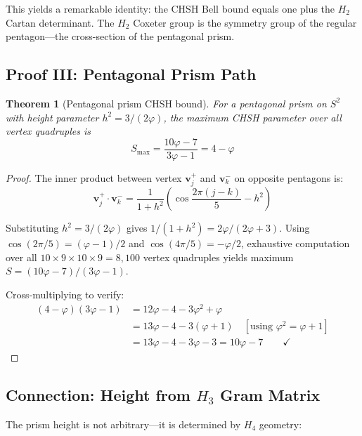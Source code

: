 \documentclass[12pt,a4paper]{article}
\newtheorem{theorem}{Theorem}
\newcommand{\vp}{\varphi}
\newcommand{\Smax}{S_{\max}}
\begin{document}
This yields a remarkable identity: the CHSH Bell bound equals one plus 
the $H_2$ Cartan determinant. The $H_2$ Coxeter group is the symmetry group 
of the regular pentagon---the cross-section of the pentagonal prism.

\subsection{Proof III: Pentagonal Prism Path}
\label{sec:proof_prism}

\begin{theorem}[Pentagonal prism CHSH bound]
\label{thm:prism_bound}
For a pentagonal prism on $S^2$ with height parameter $h^2 = 3/(2\vp)$, 
the maximum CHSH parameter over all vertex quadruples is
\begin{equation}
\Smax = \frac{10\vp - 7}{3\vp - 1} = 4 - \vp
\end{equation}
\end{theorem}

\begin{proof}
The inner product between vertex $\mathbf{v}_j^+$ and $\mathbf{v}_k^-$ 
on opposite pentagons is:
\begin{equation}
\mathbf{v}_j^+ \cdot \mathbf{v}_k^- = \frac{1}{1+h^2}\left(\cos\frac{2\pi(j-k)}{5} - h^2\right)
\end{equation}

Substituting $h^2 = 3/(2\vp)$ gives $1/(1+h^2) = 2\vp/(2\vp+3)$.
Using $\cos(2\pi/5) = (\vp-1)/2$ and $\cos(4\pi/5) = -\vp/2$, exhaustive 
computation over all $10 \times 9 \times 10 \times 9 = 8{,}100$ vertex 
quadruples yields maximum $S = (10\vp - 7)/(3\vp - 1)$.

Cross-multiplying to verify:
\begin{align}
(4-\vp)(3\vp - 1) &= 12\vp - 4 - 3\vp^2 + \vp \\
&= 13\vp - 4 - 3(\vp+1) \quad [\text{using } \vp^2 = \vp+1] \\
&= 13\vp - 4 - 3\vp - 3 = 10\vp - 7 \qquad\checkmark
\end{align}
\end{proof}

\subsection{Connection: Height from $H_3$ Gram Matrix}
\label{sec:height_connection}

The prism height is not arbitrary---it is determined by $H_4$ geometry:
\end{document}
